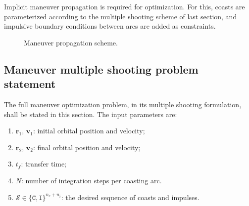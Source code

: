 Implicit maneuver propagation is required for optimization. For this, coasts are parameterized according to the multiple shooting scheme of last section, and impulsive boundary conditions between arcs are added as constraints.  


\begin{figure}[htbp]
    \centering
    \caption{Maneuver propagation scheme.}
    \label{fig:maneuver_propagation}
\end{figure}


\subsection{Maneuver multiple shooting problem statement}

The full maneuver optimization problem, in its multiple shooting formulation, shall be stated in this section. The input parameters are:
\begin{enumerate}
    \item \(\mathbf{r}_1\), \(\mathbf{v}_1\): initial orbital position and velocity;
    \item \(\mathbf{r}_2\), \(\mathbf{v}_2\): final orbital position and velocity;
    \item \(t_f\): transfer time;
    \item \(N\): number of integration steps per coasting arc.
    \item \(\mathcal{S} \in \{\texttt{C}, \texttt{I}\}^{n_c + n_i}\): the desired sequence of coasts and impulses.
\end{enumerate}

